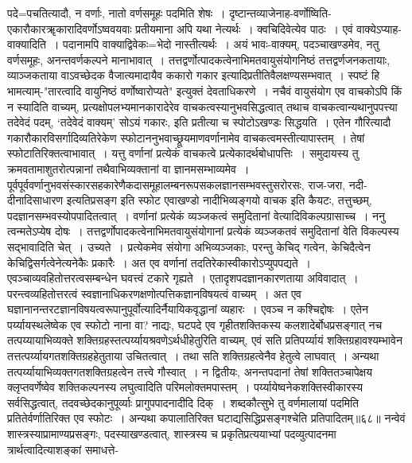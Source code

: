 {{{{ पदे=पचतित्यादौ, न वर्णाः, नातो वर्णसमूहः पदमिति शेषः~।
दृष्टान्तव्याजेनाह-वर्णोष्विति-एकारौकारॠकारादिवर्णोऽष्ववयवाः प्रतीयमाना अपि यथा नेत्यर्थः~।
क्वचिदिवेत्येव पाठः~।
एवं वाक्येऽप्याह-वाक्यादिति~।
पदानामपि वाक्याद्विवेकः=भेदो नास्तीत्यर्थः~।
अयं भावः-वाक्यम्, पदञ्चाखण्डमेव, नतु वर्णसमूहः, अनन्तवर्णकल्पने मानाभावात्~।
तत्तद्वर्णोत्पादकत्वेनाभिमतवायुसंयोगनिष्ठं तत्तद्वर्णजनकतायाः, व्याञ्जकताया वाऽवच्छेदक वैजात्यमादायैव ककारो गकार इत्यादिप्रतीतिवैलक्षण्यसम्भवात्~।
स्पष्टं हि भामत्याम्-"तारत्वादि वायुनिष्ठं वर्णोष्वारोप्यते" इत्युक्तं देवताधिकरणे~।
नचैवं वायुसंयोग एव वाचकोऽपि किं न स्यादिति वाच्यम्, प्रत्यक्षोपलभ्यमानकारादेरेव वाचकत्वस्यानुभवसिद्धत्वात् तथाच वाचकत्वान्यथानुपपत्त्या तदेवेदं पदम्, `तदेवेदं वाक्यम्' सोऽयं गकारः, इति प्रतीत्या च स्पोटोऽखण्डः सिद्धयति~।
एतेन गौरित्यादौ गकारौकारविसर्गादिव्यतिरेकेण स्फोटाननुभवाच्छ्रूयमाणवर्णानामेव वाचकत्वमस्तीत्यापास्तम्~।
तेषां स्फोटातिरिक्तत्वाभावात्~।
यत्तु वर्णानां प्रत्येकं वाचकत्वे प्रत्येकादर्थबोधापत्तिः~।
समुदायस्य तु क्रमवतामाशुतरोत्पन्नानां तथैवाभिव्यक्तानां वा ज्ञानमसम्भाव्यमेव~।
पूर्वपूर्ववर्णानुभवसंस्कारसहकारेणैकदासमूहालम्बनरूपसकलज्ञानसम्भवस्तुसरोरसः, राज-जरा, नदी-दीनादिसाधारण इत्यतिप्रसङ्ग इति स्फोट एवाखण्डो नादीभिव्यङ्गयो वाचक इति कैयटः, तत्तुच्छम्, पदज्ञानसम्भवस्योपपादितत्वात्~।
वर्णानां प्रत्येकं व्यञ्जकत्वं समुदितानां वेत्यादिविकल्पग्रासाच्च~।
 ननु त्वन्मतेऽप्येष दोषः~।
तत्तद्वर्णोपादकत्वेनाभिमतवायुसंयोगानां प्रत्येकं व्यञ्जकतवं समुदितानां वेति विकल्पस्य सद्भावादिति चेत्~।
उच्यते~।
प्रत्येकमेव संयोगा अभिव्यञ्जकाः, परन्तु केचिद् गत्वेन, केचिदैत्वेन केचिद्विसर्गत्वेनेत्यनेकैः प्रकारैः~।
अत एव वर्णानां तदतिरेकास्वीकारोऽप्युपपद्यते~।
एवञ्चाव्यवहितोत्तरत्वसम्बन्धेन घवत्त्वं टकारे गृह्यते~।
एतादृशपदज्ञानकारणताया अविवादात्~।
परन्त्वव्यहितोत्तरत्वं स्वज्ञानाधिकरणक्षणोत्पत्तिकज्ञानविषयत्वं वाच्यम्~।
अत एव घज्ञानानन्तरटज्ञानविषयत्वरूपानुपूर्वोत्यादिर्नैयायिकवृद्धानां व्यहारः~।
एवञ्च न कश्चिद्दोषः~।
एतेन पर्य्यायस्थलेष्वेक एव स्फोटो नाना वा? नाद्यः, घटपदे एव गृहीतशक्तिकस्य कलशादेर्बोधप्रसङ्गात् नच तत्पय्यायाभिव्यक्ते शक्तिग्रहस्तत्पर्य्यायश्रवणेऽर्थधीहेतुरिति वाच्यम्, एवं सति प्रतिपर्य्यायं शक्तिग्रहावश्यम्भावेन तत्तत्पर्य्यायगतशक्तिग्रहहेतुताया उचितत्वात्~।
तथा सति शक्तिग्रहत्वेनैव हेतुत्वे लाघवात्~।
अन्यथा तत्पर्य्यायाभिव्यक्तगतशक्तिग्रहत्वेन तत्त्वे गौस्वात्~।
न द्वितीयः, अनन्तपदानां तेषां शक्तितञ्चापेक्षय क्लृप्तवर्णेष्वेव शक्तिकल्पनस्य लघुत्वादिति परिमलोक्तमपास्तम्~।
पर्य्यायेष्वनेकशक्तिस्वीकारस्य सर्वसिद्धत्वात्, तदवच्छेदकानुपूर्व्याः प्रागुपपादनादीदि दिक्~।
शब्दकौत्सुभे तु वर्णमालायां पदमिति प्रतितेर्वर्णातिरिक्त एव स्फोटः~।
अन्यथा कपालातिरिक्त घटाद्यसिद्धिप्रसङ्गश्चेति प्रतिपादितम्॥६८॥
 नन्वेवं शास्त्रस्याप्रामाण्यप्रसङ्गः, पदस्याखण्डत्वात्, शास्त्रस्य च प्रकृतिप्रत्ययाभ्यां पदव्युत्पादनमा त्रार्थत्वादित्याशङ्कां समाधत्ते-
}}}}
